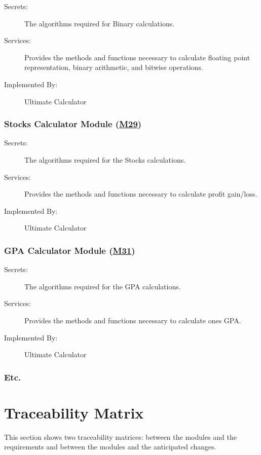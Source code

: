 \documentclass[12pt, titlepage]{article}
\begin{document}
\begin{description}
\item[Secrets:]The algorithms required for Binary calculations.
\item[Services:] Provides the methods and functions necessary to calculate floating point representation, binary arithmetic, and bitwise operations.
\item[Implemented By:] Ultimate Calculator
\end{description}

\subsubsection{Stocks Calculator Module (\hyperref[m29]{M29})}

\begin{description}
\item[Secrets:]The algorithms required for the Stocks calculations.
\item[Services:] Provides the methods and functions necessary to calculate profit gain/loss.
\item[Implemented By:] Ultimate Calculator
\end{description}

\subsubsection{GPA Calculator Module (\hyperref[m31]{M31})}

\begin{description}
\item[Secrets:]The algorithms required for the GPA calculations.
\item[Services:] Provides the methods and functions necessary to calculate ones GPA.
\item[Implemented By:] Ultimate Calculator
\end{description}

\subsubsection{Etc.}

\section{Traceability Matrix} \label{SecTM}

This section shows two traceability matrices: between the modules and the
requirements and between the modules and the anticipated changes.
\end{document}
